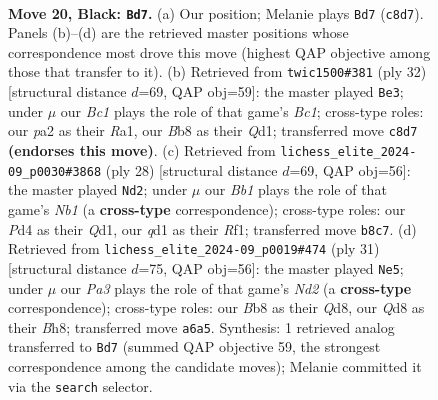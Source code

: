 \documentclass[11pt]{article}
\begin{document}
\clearpage

\begin{figure}[p]\centering
\begin{subfigure}{0.46\textwidth}\centering
\resizebox{\linewidth}{!}{%
\newchessgame
\chessboard[
  setfen={rbbqr1k1/1p3ppp/pP2p1n1/8/3p2P1/1P5B/P2P1P1P/RNBQRK2 b - - 1 20},
  showmover=false,
  pgfstyle=straightmove, color=movearrow, markmove={c8-d7}
]}
\caption{}
\end{subfigure}\hfill
\begin{subfigure}{0.46\textwidth}\centering
\resizebox{\linewidth}{!}{%
\newchessgame
\chessboard[
  setfen={r1bqr1k1/ppb2ppp/2p5/2npP3/P7/2P2P2/1PB3PP/R1BQRNK1 w - - 1 17},
  showmover=false,
  pgfstyle=straightmove, color=movearrow, markmove={c1-e3}
]}
\caption{}
\end{subfigure}
\\[4pt]
\begin{subfigure}{0.46\textwidth}\centering
\resizebox{\linewidth}{!}{%
\newchessgame
\chessboard[
  setfen={r4r1k/pp1qp1bp/2n1b3/2ppPp2/5P2/3P3P/PPP3BK/RNBQ1R2 w - - 3 15},
  showmover=false,
  pgfstyle=straightmove, color=movearrow, markmove={b1-d2}
]}
\caption{}
\end{subfigure}\hfill
\begin{subfigure}{0.46\textwidth}\centering
\resizebox{\linewidth}{!}{%
\newchessgame
\chessboard[
  setfen={r2qr1kb/pppn1p1p/2bp2pB/8/4P2P/2N3P1/PPPQ1PB1/R3R1K1 b - - 0 16},
  showmover=false,
  pgfstyle=straightmove, color=movearrow, markmove={d7-e5}
]}
\caption{}
\end{subfigure}
\caption{\textbf{Move 20, Black: \texttt{Bd7}.} (a) Our position; Melanie plays \texttt{Bd7} (\texttt{c8d7}). Panels (b)--(d) are the retrieved master positions whose correspondence most drove this move (highest QAP objective among those that transfer to it). (b) Retrieved from \texttt{twic1500\#381} (ply 32) [structural distance $d$=69, QAP obj=59]: the master played \texttt{Be3}; under $\mu$ our \emph{Bc1} plays the role of that game's \emph{Bc1}; cross-type roles: our \emph{p}a2 as their \emph{R}a1, our \emph{B}b8 as their \emph{Q}d1; transferred move \texttt{c8d7} \textbf{(endorses this move)}. (c) Retrieved from \texttt{lichess\_elite\_2024-09\_p0030\#3868} (ply 28) [structural distance $d$=69, QAP obj=56]: the master played \texttt{Nd2}; under $\mu$ our \emph{Bb1} plays the role of that game's \emph{Nb1} (a \textbf{cross-type} correspondence); cross-type roles: our \emph{P}d4 as their \emph{Q}d1, our \emph{q}d1 as their \emph{R}f1; transferred move \texttt{b8c7}. (d) Retrieved from \texttt{lichess\_elite\_2024-09\_p0019\#474} (ply 31) [structural distance $d$=75, QAP obj=56]: the master played \texttt{Ne5}; under $\mu$ our \emph{Pa3} plays the role of that game's \emph{Nd2} (a \textbf{cross-type} correspondence); cross-type roles: our \emph{B}b8 as their \emph{Q}d8, our \emph{Q}d8 as their \emph{B}h8; transferred move \texttt{a6a5}. Synthesis: 1 retrieved analog transferred to \texttt{Bd7} (summed QAP objective 59, the strongest correspondence among the candidate moves); Melanie committed it via the \texttt{search} selector.}
\label{fig:thought-m39}
\end{figure}
\end{document}
